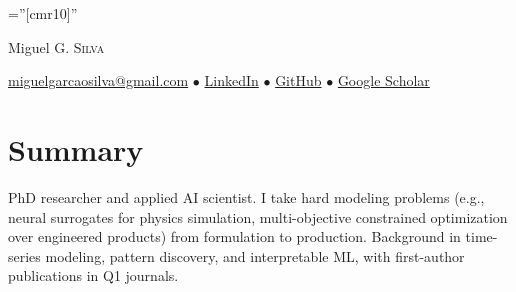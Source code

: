 \documentclass[a4paper,10pt]{article}
\begin{document}
\color{StrongGray}

\pagestyle{empty} %

\font\fb=''[cmr10]'' %

\par{\centering
		{\Huge Miguel \textsc{G. Silva}
	}\medskip\par}


\begin{center}
\href{mailto:miguelgarcaosilva@gmail.com}{miguelgarcaosilva@gmail.com} \enspace $\bullet$ \enspace
\href{https://www.linkedin.com/in/miguelgarcaosilva/}{LinkedIn} \enspace $\bullet$ \enspace
\href{https://github.com/miguelgarcaosilva}{GitHub} \enspace $\bullet$ \enspace
\href{https://scholar.google.com/citations?user=d2wE68gAAAAJ}{Google Scholar}
\end{center}
\medskip

\section{Summary}

PhD researcher and applied AI scientist. I take hard modeling problems (e.g., neural surrogates for physics simulation, multi-objective constrained optimization over engineered products) from formulation to production. Background in time-series modeling, pattern discovery, and interpretable ML, with first-author publications in Q1 journals.



\end{document}
